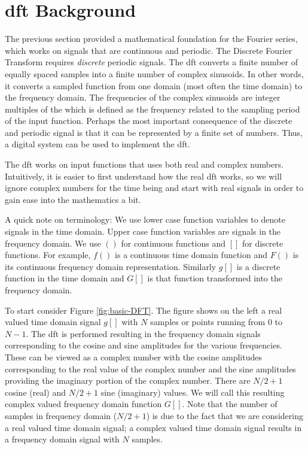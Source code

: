 \section{\gls{dft} Background}
\label{sec:DFTbackground}

The previous section provided a mathematical foundation for the Fourier series, which works on signals that are continuous and periodic. The Discrete Fourier Transform requires \emph{discrete} periodic signals. The \gls{dft} converts a finite number of equally spaced samples into a finite number of complex sinusoids. In other words, it converts a sampled function from one domain (most often the time domain) to the frequency domain. The frequencies of the complex sinusoids are integer multiples of the  which is defined as the frequency related to the sampling period of the input function. Perhaps the most important consequence of the discrete and periodic signal is that it can be represented by a finite set of numbers. Thus, a digital system can be used to implement the \gls{dft}.  

The \gls{dft} works on input functions that uses both real and complex numbers. Intuitively, it is easier to first understand how the real \gls{dft} works, so we will ignore complex numbers for the time being and start with real signals in order to gain ease into the mathematics a bit. 
\begin{aside}
A quick note on terminology: We use lower case function variables to denote signals in the time domain. Upper case function variables are signals in the frequency domain. We use $( )$ for continuous functions and $[ ]$ for discrete functions. For example, $f( )$ is a continuous time domain function and $F( )$ is its continuous frequency domain representation. Similarly $g[ ]$ is a discrete function in the time domain and $G[ ]$ is that function transformed into the frequency domain. 
\end{aside}

To start consider Figure \ref{fig:basic-DFT}. The figure shows on the left a real valued time domain signal $g[ ]$ with $N$ samples or points running from $0$ to $N-1$. The \gls{dft} is performed resulting in the frequency domain signals corresponding to the cosine and sine amplitudes for the various frequencies. These can be viewed as a complex number with the cosine amplitudes corresponding to the real value of the complex number and the sine amplitudes providing the imaginary portion of the complex number. There are $N/2 + 1$ cosine (real) and $N/2 + 1$ sine (imaginary) values. We will call this resulting complex valued frequency domain function $G[ ]$. Note that the number of samples in frequency domain ($N/2 + 1$) is due to the fact that we are considering a real valued time domain signal; a complex valued time domain signal results in a frequency domain signal with $N$ samples.

